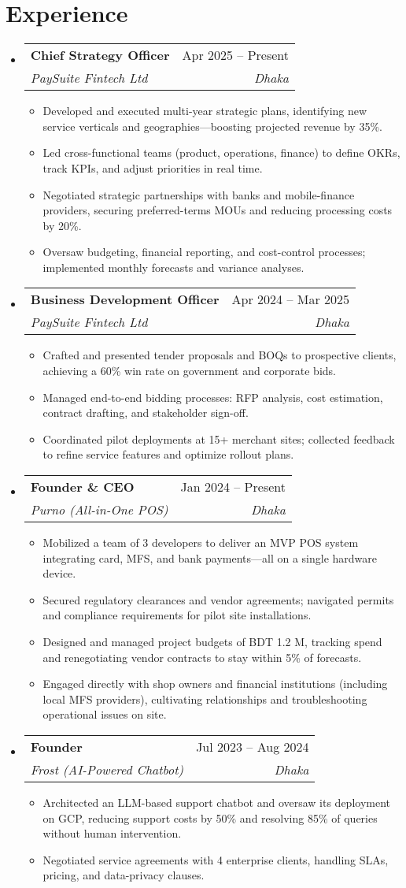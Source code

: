 \documentclass[letterpaper,11pt]{article}
\makeatletter
\newcommand{\resumeItem}[1]{
  \item\small{
    {#1 \vspace{-2pt}}
  }
}
\newcommand{\resumeSubheading}[4]{
  \vspace{-2pt}\item
    \begin{tabular*}{0.97\textwidth}[t]{l@{\extracolsep{\fill}}r}
      \textbf{#1} & #2 \\
      \textit{\small#3} & \textit{\small #4} \\
    \end{tabular*}\vspace{-7pt}
}
\newcommand{\resumeSubHeadingListStart}{\begin{itemize}[leftmargin=0.15in, label={}]}
\newcommand{\resumeSubHeadingListEnd}{\end{itemize}}
\newcommand{\resumeItemListStart}{\begin{itemize}}
\newcommand{\resumeItemListEnd}{\end{itemize}\vspace{-5pt}}
\makeatother
\begin{document}
\section{Experience}
  \resumeSubHeadingListStart
    \resumeSubheading
      {Chief Strategy Officer}{Apr 2025 -- Present}
      {PaySuite Fintech Ltd}{Dhaka}
      \resumeItemListStart
        \resumeItem{Developed and executed multi-year strategic plans, identifying new service verticals and geographies---boosting projected revenue by 35\%.}
        \resumeItem{Led cross-functional teams (product, operations, finance) to define OKRs, track KPIs, and adjust priorities in real time.}
        \resumeItem{Negotiated strategic partnerships with banks and mobile-finance providers, securing preferred-terms MOUs and reducing processing costs by 20\%.}
        \resumeItem{Oversaw budgeting, financial reporting, and cost-control processes; implemented monthly forecasts and variance analyses.}
      \resumeItemListEnd
    \resumeSubheading
      {Business Development Officer}{Apr 2024 -- Mar 2025}
      {PaySuite Fintech Ltd}{Dhaka}
      \resumeItemListStart
        \resumeItem{Crafted and presented tender proposals and BOQs to prospective clients, achieving a 60\% win rate on government and corporate bids.}
        \resumeItem{Managed end-to-end bidding processes: RFP analysis, cost estimation, contract drafting, and stakeholder sign-off.}
        \resumeItem{Coordinated pilot deployments at 15+ merchant sites; collected feedback to refine service features and optimize rollout plans.}
      \resumeItemListEnd
    \resumeSubheading
      {Founder \& CEO}{Jan 2024 -- Present}
      {Purno (All-in-One POS)}{Dhaka}
      \resumeItemListStart
        \resumeItem{Mobilized a team of 3 developers to deliver an MVP POS system integrating card, MFS, and bank payments---all on a single hardware device.}
        \resumeItem{Secured regulatory clearances and vendor agreements; navigated permits and compliance requirements for pilot site installations.}
        \resumeItem{Designed and managed project budgets of BDT 1.2 M, tracking spend and renegotiating vendor contracts to stay within 5\% of forecasts.}
        \resumeItem{Engaged directly with shop owners and financial institutions (including local MFS providers), cultivating relationships and troubleshooting operational issues on site.}
      \resumeItemListEnd
    \resumeSubheading
      {Founder}{Jul 2023 -- Aug 2024}
      {Frost (AI-Powered Chatbot)}{Dhaka}
      \resumeItemListStart
        \resumeItem{Architected an LLM-based support chatbot and oversaw its deployment on GCP, reducing support costs by 50\% and resolving 85\% of queries without human intervention.}
        \resumeItem{Negotiated service agreements with 4 enterprise clients, handling SLAs, pricing, and data-privacy clauses.}
      \resumeItemListEnd
  \resumeSubHeadingListEnd
\end{document}
